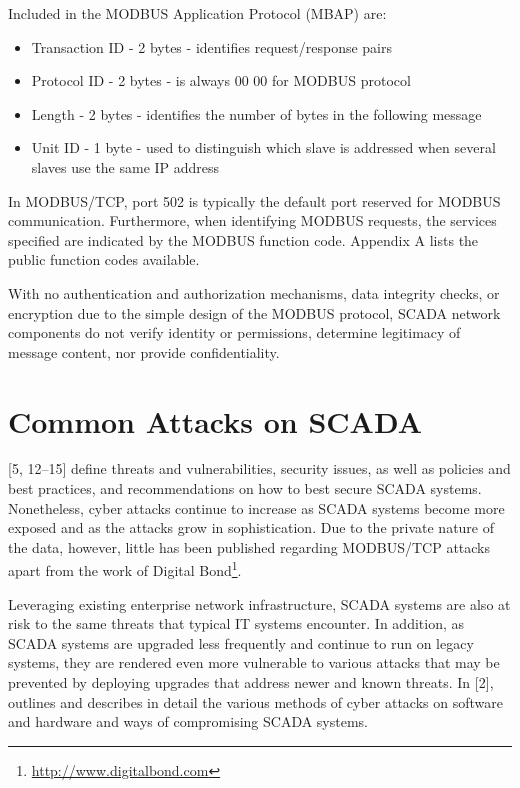 \documentclass[11pt,a4paper]{article}
\let\rmarkdownfootnote\footnote%
\def\footnote{\protect\rmarkdownfootnote}
\begin{document}
Included in the MODBUS Application Protocol (MBAP) are:

\begin{itemize}
\itemsep1pt\parskip0pt
\item
  Transaction ID - 2 bytes - identifies request/response pairs
\item
  Protocol ID - 2 bytes - is always 00 00 for MODBUS protocol
\item
  Length - 2 bytes - identifies the number of bytes in the following
  message
\item
  Unit ID - 1 byte - used to distinguish which slave is addressed when
  several slaves use the same IP address
\end{itemize}

In MODBUS/TCP, port 502 is typically the default port reserved for
MODBUS communication. Furthermore, when identifying MODBUS requests, the
services specified are indicated by the MODBUS function code. Appendix A
lists the public function codes available.

With no authentication and authorization mechanisms, data integrity
checks, or encryption due to the simple design of the MODBUS protocol,
SCADA network components do not verify identity or permissions,
determine legitimacy of message content, nor provide confidentiality.

\clearpage

\section{Common Attacks on SCADA}\label{common-attacks-on-scada}

{[}5, 12--15{]} define threats and vulnerabilities, security issues, as
well as policies and best practices, and recommendations on how to best
secure SCADA systems. Nonetheless, cyber attacks continue to increase as
SCADA systems become more exposed and as the attacks grow in
sophistication. Due to the private nature of the data, however, little
has been published regarding MODBUS/TCP attacks apart from the work of
Digital Bond\footnote{\url{http://www.digitalbond.com}}.

Leveraging existing enterprise network infrastructure, SCADA systems are
also at risk to the same threats that typical IT systems encounter. In
addition, as SCADA systems are upgraded less frequently and continue to
run on legacy systems, they are rendered even more vulnerable to various
attacks that may be prevented by deploying upgrades that address newer
and known threats. In {[}2{]}, outlines and describes in detail the
various methods of cyber attacks on software and hardware and ways of
compromising SCADA systems.
\end{document}
